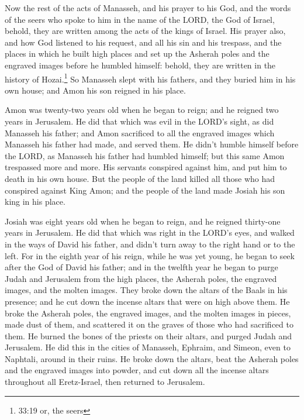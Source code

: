 \myverse{}Now the rest of the acts of Manasseh, and his prayer to his
God, and the words of the seers who spoke to him in the name of the LORD, the God of Israel, behold, they
are written among the acts of the kings of Israel.
\myverse{}His prayer also, and how God listened to his request, and all his sin and
his trespass, and the places in which he built high places and set up the Asherah poles and the engraved
images before he humbled himself: behold, they are written in the history of Hozai.\footnote{33:19 or, the seers}
\myverse{}So Manasseh slept with his fathers, and they buried him in his own house;
and Amon his son reigned in his place.

\myverse{}Amon was twenty-two years old when he began to reign; and he
reigned two years in Jerusalem.
\myverse{}He did that which was evil in the LORD’s sight, as did Manasseh his father;
and Amon sacrificed to all the engraved images which Manasseh his father had made, and served them.
\myverse{}He didn’t humble himself before the LORD, as Manasseh his father had humbled
himself; but this same Amon trespassed more and more.
\myverse{}His servants conspired against him, and put him to death in his own house.
\myverse{}But the people of the land killed all those who had conspired against King
Amon; and the people of the land made Josiah his son king in his place.


\mychapter{} \myverse*{}Josiah was eight years old when he began to reign, and he reigned
thirty-one years in Jerusalem.
\myverse{}He did that which was right in the LORD’s eyes, and walked in the ways of David
his father, and didn’t turn away to the right hand or to the left.
\myverse{}For in the eighth year of his reign, while he was yet young, he began to seek
after the God of David his father; and in the twelfth year he began to purge Judah and Jerusalem from
the high places, the Asherah poles, the engraved images, and the molten images.
\myverse{}They broke down the altars of the Baals in his presence; and he cut down the
incense altars that were on high above them. He broke the Asherah poles, the engraved images, and the
molten images in pieces, made dust of them, and scattered it on the graves of those who had sacrificed
to them.
\myverse{}He burned the bones of the priests on their altars, and purged Judah and Jerusalem.
\myverse{}He did this in the cities of Manasseh, Ephraim, and Simeon, even to Naphtali,
around in their ruins.
\myverse{}He broke down the altars, beat the Asherah poles and the engraved images into
powder, and cut down all the incense altars throughout all Eretz-Israel, then returned to Jerusalem.

